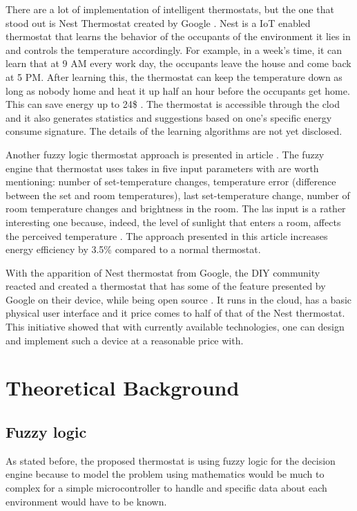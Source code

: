 \documentclass[conference]{IEEEtran}
\let\Oldsection\section
\renewcommand{\section}{\FloatBarrier\Oldsection}
\let\Oldsubsection\subsection
\renewcommand{\subsection}{\FloatBarrier\Oldsubsection}
\begin{document}
There are a lot of implementation of intelligent thermostats, but the one that stood out is Nest Thermostat
created by Google \cite{website:nest}. Nest is a IoT enabled thermostat that learns the behavior of the
occupants of the environment it lies in and controls the temperature accordingly. For example, in a week's
time, it can learn that at 9 AM every work day, the occupants leave the house and come back at 5 PM. After
learning this, the thermostat can keep the temperature down as long as nobody home and heat it up half an
hour before the occupants get home. This can save energy up to 24\$ \cite{website:nestsaving}.
The thermostat is accessible through the clod and it also generates statistics and suggestions based on
one's specific energy consume signature. The details of the learning algorithms are not yet disclosed.

Another fuzzy logic thermostat approach is presented in article \cite{FuzzyAppliences}. The fuzzy engine
that thermostat uses takes in five input parameters with are worth mentioning: number of set-temperature
changes, temperature error (difference between the set and room temperatures), last set-temperature change,
number of room temperature changes and brightness in the room. The las input is a rather interesting one
because, indeed, the level of sunlight that enters a room, affects the perceived temperature
\cite{human_comfort}. The approach presented in this article increases energy efficiency by 3.5\% compared
to a normal thermostat.

With the apparition of Nest thermostat from Google, the DIY community reacted and created a thermostat that
has some of the feature presented by Google on their device, while being open source \cite{website:nestos}. It
runs in the cloud, has a basic physical user interface and it price comes to half of that of the Nest
thermostat. This initiative showed that with currently available technologies, one can design and implement
such a device at a reasonable price with.

\section{Theoretical Background}
\label{Theoretical Background}

\subsection{Fuzzy logic}

As stated before, the proposed thermostat is using fuzzy logic for the decision engine because to model the
problem using mathematics would be much to complex for a simple microcontroller to handle and specific data
about each environment would have to be known.
\end{document}
